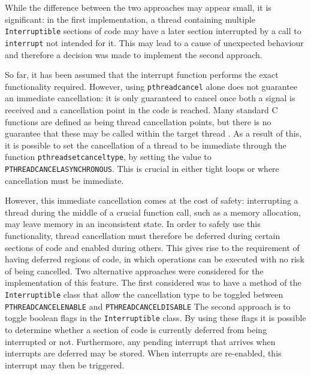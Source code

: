 While the difference between the two approaches may appear small, it is significant: 
in the first implementation, a thread containing multiple \texttt{Interruptible} 
sections of code may have a later section interrupted by a call to \texttt{interrupt}
not intended for it. This may lead to a cause of unexpected behaviour and therefore 
a decision was made to implement the second approach. 
\par\bigskip\noindent
So far, it has been assumed that the interrupt function performs the exact 
functionality required. 
However, using \texttt{pthread\textunderscore{}cancel} alone does not guarantee 
an immediate cancellation: it is only guaranteed 
to cancel once both a signal is received and a cancellation point in the code 
is reached. 
Many standard C functions are defined as being thread cancellation points, but 
there is no guarantee that these may be called within the target thread 
\cite{pthread-cancel-points}. As a result of this, it is possible to set the 
cancellation of a thread to be immediate through the function 
\texttt{pthread\textunderscore{}setcanceltype}, by setting the value to 
\texttt{PTHREAD\textunderscore{}CANCEL\textunderscore{}ASYNCHRONOUS}. This is 
crucial in either tight loops or where cancellation must be immediate. 
\par\bigskip\noindent
However, this immediate cancellation comes at the cost of safety: interrupting a 
thread during the middle of a crucial function call, such as a memory allocation, 
may leave memory in an inconsistent state. In order to safely use this functionality, 
thread cancellation must therefore be deferred during certain sections of code 
and enabled during others. This gives rise to the requirement of having 
deferred regions of code, in which operations can be executed with no risk of 
being cancelled. Two alternative approaches were considered for the implementation 
of this feature. The first considered was to have a method of the 
\texttt{Interruptible} class that allow the cancellation type to be toggled 
between \texttt{PTHREAD\textunderscore{}CANCEL\textunderscore{}ENABLE}
and \texttt{PTHREAD\textunderscore{}CANCEL\textunderscore{}DISABLE}
The second approach is to toggle boolean flags in the \texttt{Interruptible} class. 
By using these flags it is possible to determine whether a section of code is 
currently deferred from being interrupted or not. 
Furthermore, any pending interrupt that arrives when interrupts are deferred may 
be stored. When interrupts are re-enabled, this interrupt may then be triggered. 
